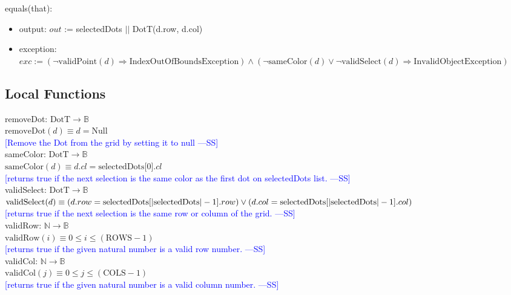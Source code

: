 \documentclass[12pt]{article}
\newcommand{\authornote}[3]{\textcolor{#1}{[#3 ---#2]}}
\newcommand{\authornote}[3]{}
\newcommand{\wss}[1]{\authornote{blue}{SS}{#1}}
\begin{document}
\noindent equals(that):
\begin{itemize}
\item output: $out$ := selectedDots $||$ DotT(d.row, d.col)
\item exception: $exc := (\neg \mbox{validPoint}(d) \Rightarrow \mbox{IndexOutOfBoundsException})
\wedge (\neg \mbox{sameColor}(d) \vee \neg \mbox{validSelect}(d) \Rightarrow \mbox{InvalidObjectException})$
\end{itemize}

\newpage

\subsection*{Local Functions}

\noindent removeDot: $\mbox{DotT} \rightarrow \mathbb{B}$\\
$\mbox{removeDot}(d) \equiv  d = \mbox{Null}$\\
\noindent \wss{Remove the Dot from the grid by setting it to null}\\

\noindent sameColor: $\mbox{DotT} \rightarrow \mathbb{B}$\\
$\mbox{sameColor}(d) \equiv  d.cl = \mbox{selectedDots[0]}.cl$\\
\noindent \wss{returns true if the next selection is the same color as the first dot on selectedDots list.}\\

\noindent validSelect: $\mbox{DotT} \rightarrow \mathbb{B}$\\
$\mbox{validSelect}(d) \equiv  (d.row = \mbox{selectedDots}[|\mbox{selectedDots}| - 1].row) \vee \\ 
(d.col = \mbox{selectedDots}[|\mbox{selectedDots}| - 1].col)$\\
\noindent \wss{returns true if the next selection is the same row or column of the grid.}\\

\noindent validRow: $\mathbb{N} \rightarrow \mathbb{B}$\\
$\mbox{validRow}(i) \equiv 0 \leq i \leq (\mbox{ROWS} - 1)$\\
\noindent \wss{returns true if the given natural number is a valid row number.}\\

\noindent validCol: $\mathbb{N} \rightarrow \mathbb{B}$\\
$\mbox{validCol}(j) \equiv 0 \leq j \leq (\mbox{COLS} - 1)$\\
\noindent \wss{returns true if the given natural number is a valid column number.}\\
\end{document}
